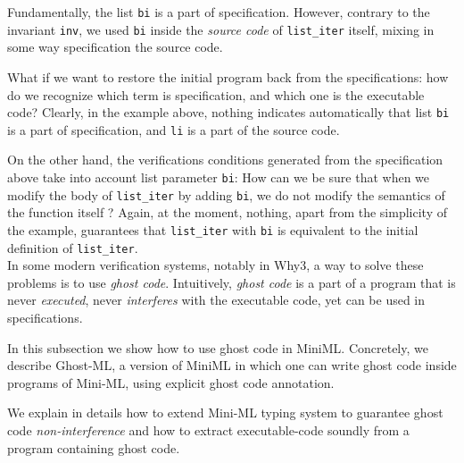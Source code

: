\documentclass[a4paper,11pt,oneside]{article}
\theoremstyle{plain}
\begin{document}
Fundamentally, the list \texttt{bi} is a part of specification.
However, contrary to the invariant \texttt{inv}, we used \texttt{bi} inside the \textit{source code} of \texttt{list\_iter} itself, mixing in some way specification  the source code.  

What if we want to restore the initial program back from the specifications: 
how do we recognize which term is specification, and which one is the executable code?
Clearly, in the example above, nothing indicates automatically that list \texttt{bi} is a part of specification, and \texttt{li} is a part of the source code.

On the other hand, the verifications conditions generated from the specification above take into account list parameter \texttt{bi}:
How can we be sure that when we modify the body of \texttt{list\_iter} by adding  \texttt{bi}, we do not modify the semantics of the function itself ? 
Again, at the moment, nothing, apart from the simplicity of the example, guarantees that \texttt{list\_iter} with \texttt{bi} is equivalent to the initial definition of \texttt{list\_iter}. \\ 

In some modern verification systems, notably in Why3, a way to solve
these problems is to use \textit{ghost code}.
 Intuitively, \textit{ghost code} is a part of a program that is never
 \textit{executed}, never \textit{interferes} with the executable
 code, yet can be used in specifications.



In this subsection we show how to use ghost code in MiniML. Concretely, we describe Ghost-ML, a version of MiniML in which one can write ghost code inside programs of Mini-ML, using explicit ghost code annotation.

We explain in details how to extend Mini-ML typing system to guarantee ghost code \textit{non-interference} and how to extract executable-code soundly from a program containing ghost code.
\end{document}
